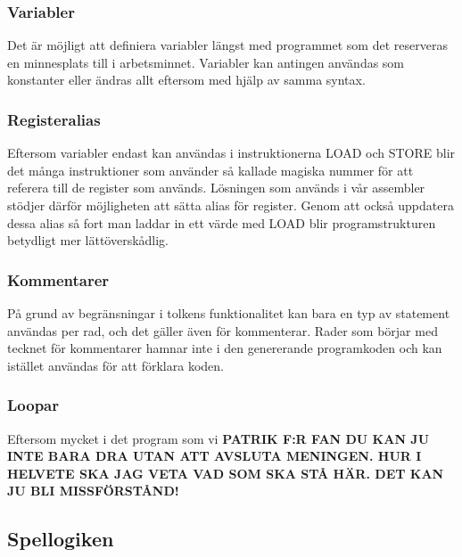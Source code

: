 \documentclass[a4paper]{article}
\begin{document}
    \subsubsection{Variabler}
    Det är möjligt att definiera variabler längst med programmet som det
    reserveras en minnesplats till i arbetsminnet. Variabler kan antingen
    användas som konstanter eller ändras allt eftersom med hjälp av samma
    syntax. 
    \subsubsection{Registeralias}
    Eftersom variabler endast kan användas i instruktionerna LOAD och STORE blir
    det många instruktioner som använder så kallade magiska nummer för att
    referera till de register som används. Lösningen som används i vår assembler
    stödjer därför möjligheten att sätta alias för register. Genom att också
    uppdatera dessa alias så fort man laddar in ett värde med LOAD blir
    programstrukturen betydligt mer lättöverskådlig. 
    \subsubsection{Kommentarer}
    På grund av begränsningar i tolkens funktionalitet kan bara en typ av
    statement användas per rad, och det gäller även för kommenterar. Rader som
    börjar med tecknet för kommentarer hamnar inte i den genererande
    programkoden och kan istället användas för att förklara koden. 
    \subsubsection{Loopar}
    Eftersom mycket i det program som vi  \textbf{PATRIK F:R FAN DU KAN JU INTE BARA
        DRA UTAN ATT AVSLUTA MENINGEN. HUR I HELVETE SKA JAG VETA VAD SOM SKA
        STÅ  HÄR. DET KAN JU BLI MISSFÖRSTÅND!}

    \subsection{Spellogiken}
\end{document}
